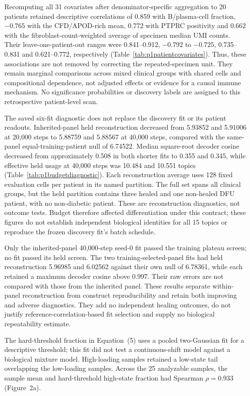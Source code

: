\documentclass[10pt,a4paper]{article}
\begin{document}
Recomputing all 31 covariates after denominator-specific aggregation to 20 patients retained descriptive correlations of 0.859 with B/plasma-cell fraction, $-0.765$ with the CFD/APOD-rich mean, 0.772 with PTPRC positivity and 0.662 with the fibroblast-count-weighted average of specimen median UMI counts. Their leave-one-patient-out ranges were 0.841--0.912, $-0.792$ to $-0.725$, 0.735--0.831 and 0.621--0.772, respectively (Table~\ref{tab:p1patientcovariates}). Thus, these associations are not removed by correcting the repeated-specimen unit. They remain marginal comparisons across mixed clinical groups with shared cells and compositional dependence, not adjusted effects or evidence for a causal immune mechanism. No significance probabilities or discovery labels are assigned to this retrospective patient-level scan.

The saved six-fit diagnostic does not replace the discovery fit or its patient readouts. Inherited-panel held reconstruction decreased from 5.93852 and 5.91006 at 20,000 steps to 5.88759 and 5.88567 at 40,000 steps, compared with the same-panel equal-training-patient null of 6.74522. Median square-root decoder cosine decreased from approximately 0.508 in both shorter fits to 0.355 and 0.345, while effective held usage at 40,000 steps was 10.484 and 10.551 topics (Table~\ref{tab:p1budgetdiagnostic}). Each reconstruction average uses 128 fixed evaluation cells per patient in its named partition. The full set spans all clinical groups, but the held partition contains three healed and one non-healed DFU patient, with no non-diabetic patient. These are reconstruction diagnostics, not outcome tests. Budget therefore affected differentiation under this contract; these figures do not establish independent biological identities for all 15 topics or reproduce the frozen discovery fit's batch schedule.

Only the inherited-panel 40,000-step seed-0 fit passed the training plateau screen; no fit passed its held screen. The two training-selected-panel fits had held reconstruction 5.96985 and 6.02562 against their own null of 6.78361, while each retained a maximum decoder cosine above 0.997. Their raw errors are not compared with those from the inherited panel. These results separate within-panel reconstruction from construct reproducibility and retain both improving and adverse diagnostics. They add no independent healing outcomes, do not justify reference-correlation-based fit selection and supply no biological repeatability estimate.

\FloatBarrier
The hard-threshold fraction in Equation~(5) uses a pooled two-Gaussian fit for a descriptive threshold; this fit did not test a continuous-shift model against a biological mixture model. High-loading samples retained a low-state tail overlapping the low-loading samples. Across the 25 analyzable samples, the sample mean and hard-threshold high-state fraction had Spearman $\rho=0.933$ (Figure~2a\label{call:p1f2}).
\end{document}
